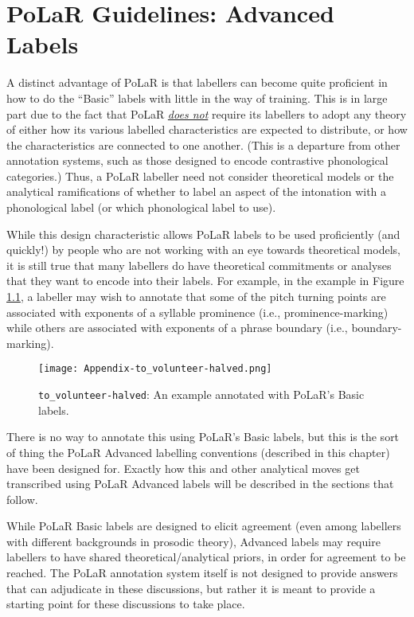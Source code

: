 \chapter{PoLaR Guidelines: Advanced Labels}\label{ch:advanced}

A distinct advantage of PoLaR is that labellers can become quite proficient in how to do the “Basic” labels with little in the way of training. This is in large part due to the fact that PoLaR \textit{\uline{does not}} require its labellers to adopt any theory of either how its various labelled characteristics are expected to distribute, or how the characteristics are connected to one another. (This is a departure from other annotation systems, such as those designed to encode contrastive phonological categories.) Thus, a PoLaR labeller need not consider theoretical models or the analytical ramifications of whether to label an aspect of the intonation with a phonological label (or which phonological label to use).

While this design characteristic allows PoLaR labels to be used proficiently (and quickly!) by people who are not working with an eye towards theoretical models, it is still true that many labellers do have theoretical commitments or analyses that they want to encode into their labels. For example, in the example in Figure \ref{fig:to volunteer-halved all basics}, a labeller may wish to annotate that some of the pitch turning points are associated with exponents of a syllable prominence (i.e., prominence-marking) while others are associated with exponents of a phrase boundary (i.e., boundary-marking).

\begin{figure}[H]
\centering
%
\texttt{[image: Appendix-to\_volunteer-halved.png]}
%
\caption{\texttt{to\_volunteer-halved}: An example annotated with PoLaR’s Basic labels.%
\label{fig:to volunteer-halved all basics}%
}
\end{figure}

There is no way to annotate this using PoLaR’s Basic labels, but this is the sort of thing the PoLaR Advanced labelling conventions (described in this chapter) have been designed for. Exactly how this and other analytical moves get transcribed using PoLaR Advanced labels will be described in the sections that follow.

While PoLaR Basic labels are designed to elicit agreement (even among labellers with different backgrounds in prosodic theory), Advanced labels may require labellers to have shared theoretical\slash analytical priors, in order for agreement to be reached. The PoLaR annotation system itself is not designed to provide answers that can adjudicate in these discussions, but rather it is meant to provide a starting point for these discussions to take place.

